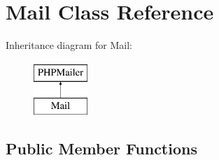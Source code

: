 \hypertarget{classMail}{\section{Mail Class Reference}
\label{classMail}
}
Inheritance diagram for Mail\-:\begin{figure}[H]
\begin{center}
\leavevmode
\includegraphics[height=2.000000cm]{classMail}
\end{center}
\end{figure}
\subsection*{Public Member Functions}
